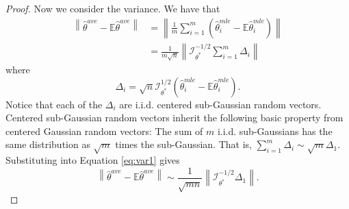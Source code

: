 \documentclass[twoside]{article}
\DeclareMathOperator*{\subG}{subG}
\newcommand{\zero}{\text{\textbf{0}}}
\newcommand{\E}{\mathbb{E}}
\newcommand{\w}{\theta}
\newcommand{\wave}{\hat\w^{ave}}
\newcommand{\wmle}{\hat\w^{mle}}
\newcommand{\wstar}{{\w^{*}}}
\newcommand{\I}{\mathcal I}
\newcommand{\normal}[2]{\ensuremath{\mathcal{N}\left({{#1}},{{#2}}\right)}}
\newcommand{\subnormal}[1]{\ensuremath{\subG\left({{#1}}\right)}}
\newcommand{\ltwobig}[1]{{\left\lVert {#1} \right\rVert}}
\begin{document}
\begin{proof}
Now we consider the variance.
We have that
\begin{align}
\ltwobig{\wave-\E\wave}
&=
\ltwobig{\frac{1}{m}\sum_{i=1}^m\left(\wmle_i-\E\wmle_i\right)}
\\&=
\frac{1}{m\sqrt{n}}\ltwobig{\I^{-1/2}_\wstar\sum_{i=1}^m\Delta_i}
\label{eq:var1}
\end{align}
where
\begin{equation}
\Delta_i = \sqrt n \I^{1/2}_\wstar\left(\wmle_i-\E\wmle_i\right)
.
\end{equation}
Notice that each of the $\Delta_i$ are i.i.d. centered sub-Gaussian random vectors.
Centered sub-Gaussian random vectors inherit the following basic property from centered Gaussian random vectors:
The sum of $m$ i.i.d. sub-Gaussians has the same distribution as $\sqrt{m}$ times the sub-Gaussian.
That is, $\sum_{i=1}^m \Delta_i \sim \sqrt{m}\Delta_1$.
Substituting into Equation \ref{eq:var1} gives
\begin{equation}
\ltwobig{\wave-\E\wave}
\sim
\frac{1}{\sqrt{mn}}\ltwobig{\I^{-1/2}_\wstar\Delta_1}
.
\label{eq:var2}
\end{equation}



\end{proof}
\end{document}
